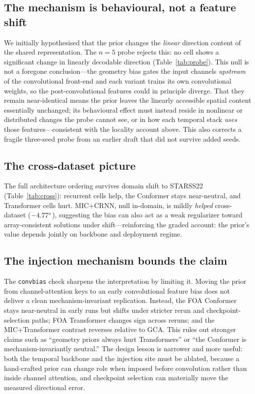 \subsection{The mechanism is behavioural, not a feature shift}
We initially hypothesised that the prior changes the \emph{linear} direction
content of the shared representation. The $n=5$ probe rejects this: no cell shows
a significant change in linearly decodable direction (Table~\ref{tab:probe}). This
null is not a foregone conclusion---the geometry bias gates the input channels
\emph{upstream} of the convolutional front-end and each variant trains its own
convolutional weights, so the post-convolutional features could in principle
diverge. That they remain near-identical means the
prior leaves the linearly accessible spatial content essentially unchanged; its
behavioural effect must instead reside in nonlinear or distributed changes the
probe cannot see, or in how each temporal stack \emph{uses} those
features---consistent with the locality account above. This also corrects a
fragile three-seed probe from an earlier draft that did not survive added seeds.

\subsection{The cross-dataset picture}
The full architecture ordering survives domain shift to STARSS22
(Table~\ref{tab:cross}): recurrent cells help, the Conformer stays
near-neutral, and Transformer cells hurt. MIC+CRNN, null in-domain, is mildly
\emph{helped} cross-dataset ($-4.77^\circ$), suggesting the bias can
also act as a weak regularizer toward array-consistent solutions under
shift---reinforcing the graded account: the prior's value
depends jointly on backbone and deployment regime.

\subsection{The injection mechanism bounds the claim}
The \texttt{convbias} check sharpens the interpretation by limiting it. Moving
the prior from channel-attention keys to an early convolutional feature bias does
not deliver a clean mechanism-invariant replication. Instead, the FOA Conformer
stays near-neutral in early runs but shifts under stricter rerun and
checkpoint-selection paths; FOA Transformer changes sign across reruns; and the
MIC+Transformer contrast reverses relative to GCA. This rules out stronger
claims such as ``geometry priors always hurt Transformers'' or ``the Conformer
is mechanism-invariantly neutral.'' The design lesson is narrower and more
useful: both the temporal backbone and the injection site must be ablated,
because a hand-crafted prior can change role when imposed before convolution
rather than inside channel attention, and checkpoint selection can materially
move the measured directional error.

